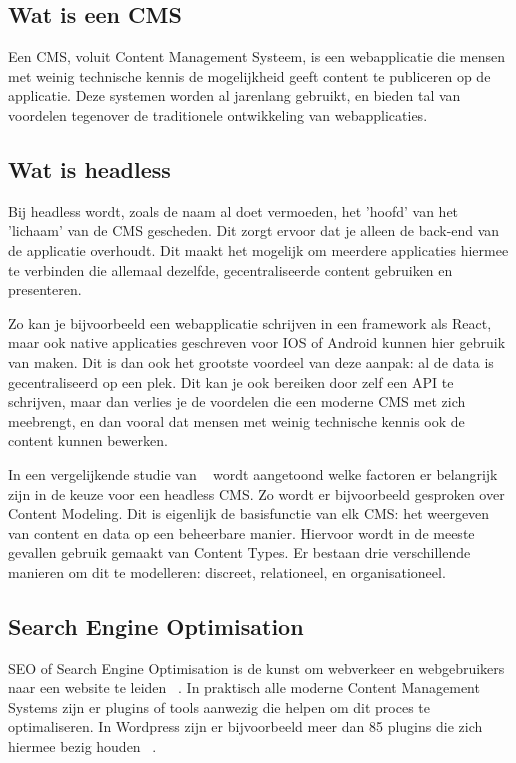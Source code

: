 \subsection{Wat is een CMS}
Een CMS, voluit Content Management Systeem, is een webapplicatie die mensen met weinig technische kennis de mogelijkheid geeft content te publiceren op de applicatie. Deze systemen worden al jarenlang gebruikt, en bieden tal van voordelen tegenover de traditionele ontwikkeling van webapplicaties.

\subsection{Wat is headless}
Bij headless wordt, zoals de naam al doet vermoeden, het 'hoofd' van het 'lichaam' van de CMS gescheden. Dit zorgt ervoor dat je alleen de back-end van de applicatie overhoudt. Dit maakt het mogelijk om meerdere applicaties hiermee te verbinden die allemaal dezelfde, gecentraliseerde content gebruiken en presenteren. 

Zo kan je bijvoorbeeld een webapplicatie schrijven in een framework als React, maar ook native applicaties geschreven voor IOS of Android kunnen hier gebruik van maken. Dit is dan ook het grootste voordeel van deze aanpak: al de data is gecentraliseerd op een plek. Dit kan je ook bereiken door zelf een API te schrijven, maar dan verlies je de voordelen die een moderne CMS met zich meebrengt, en dan vooral dat mensen met weinig technische kennis ook de content kunnen  bewerken. 

In een vergelijkende studie van ~\autocite{Barker2018} wordt aangetoond welke factoren er belangrijk zijn in de keuze voor een headless CMS. Zo wordt er bijvoorbeeld gesproken over Content Modeling. Dit is eigenlijk de basisfunctie van elk CMS: het weergeven van content en data op een beheerbare manier. Hiervoor wordt in de meeste gevallen gebruik gemaakt van Content Types. Er bestaan drie verschillende manieren om dit te modelleren: discreet, relationeel, en organisationeel.

\subsection{Search Engine Optimisation}
SEO of Search Engine Optimisation is de kunst om webverkeer en webgebruikers naar een website te leiden ~\autocite{Davis2006}. In praktisch alle moderne Content Management Systems zijn er plugins of tools aanwezig die helpen om dit proces te optimaliseren. In Wordpress zijn er bijvoorbeeld meer dan 85 plugins die zich hiermee bezig houden ~\autocite{Juliao2020}. 

